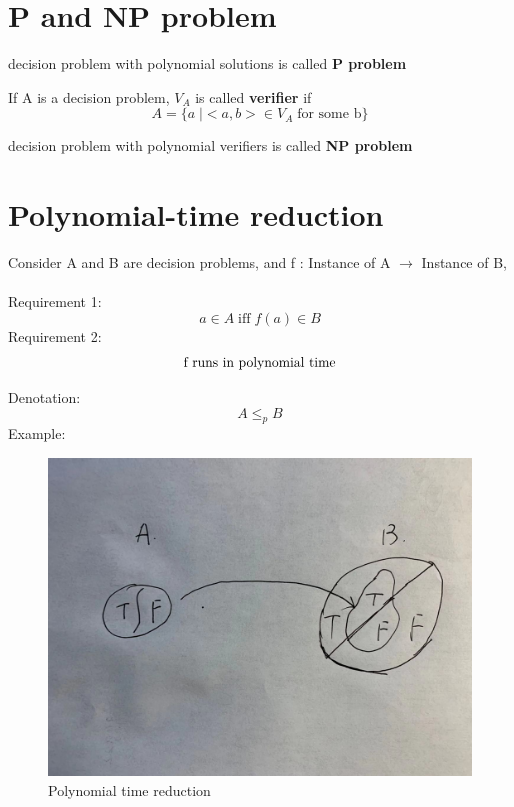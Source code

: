 \documentclass{article}
\begin{document}





\section{P and NP problem} 
\begin{definition}
decision problem with polynomial solutions is called \textbf{P problem}
\end{definition}


If A is a decision problem, $V_{A}$ is called \textbf{verifier} if
\[
A = \{a\; | <a, b> \in V_A  \; \text{for some b} \}
\]
\begin{definition}
decision problem with polynomial verifiers is called \textbf{NP problem}
\end{definition}

\section{Polynomial-time reduction} 
Consider A and B are decision problems, and f : Instance of A $\to$  Instance of B,\\
\\
Requirement 1:
\[
a \in A \; \text{iff} \; f(a) \in B
\]
Requirement 2:
\[
\textmd{f runs in polynomial time}
\]

Denotation:
\[
A \leq_{p} B
\]
Example:
\begin{figure}[h!]
		\begin{center}
			\includegraphics[scale=0.10]{fig4}
		\end{center}
		\caption{Polynomial time reduction}
	\end{figure}
\end{document}
